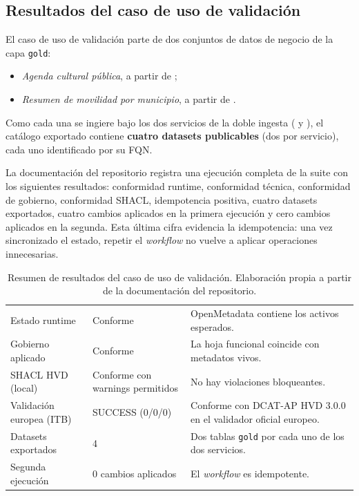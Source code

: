 
\subsection{Resultados del caso de uso de validación}

El caso de uso de validación parte de dos conjuntos de datos de negocio de la capa \texttt{gold}:

\begin{itemize}
  \item \emph{Agenda cultural pública}, a partir de ;
  \item \emph{Resumen de movilidad por municipio}, a partir de .
\end{itemize}

Como cada una se ingiere bajo los dos servicios de la doble ingesta ( y ), el catálogo exportado contiene \textbf{cuatro datasets publicables} (dos por servicio), cada uno identificado por su \ac{FQN}.

La documentación del repositorio registra una ejecución completa de la suite con los siguientes resultados: conformidad runtime, conformidad técnica, conformidad de gobierno, conformidad SHACL, idempotencia positiva, cuatro datasets exportados, cuatro cambios aplicados en la primera ejecución y cero cambios aplicados en la segunda. Esta última cifra evidencia la idempotencia: una vez sincronizado el estado, repetir el \emph{workflow} no vuelve a aplicar operaciones innecesarias.

\begin{table}[ht]
\footnotesize
\centering
\begin{tabular}{|L{5.5cm}|L{4cm}|L{4cm}|}
\hline
{}
 &  &  \\ \hline
Estado runtime & Conforme & OpenMetadata contiene los activos esperados. \\ \hline
Gobierno aplicado & Conforme & La hoja funcional coincide con metadatos vivos. \\ \hline
SHACL HVD (local) & Conforme con warnings permitidos & No hay violaciones bloqueantes. \\ \hline
Validación europea (ITB) & SUCCESS (0/0/0) & Conforme con DCAT-AP HVD 3.0.0 en el validador oficial europeo. \\ \hline
Datasets exportados & 4 & Dos tablas \texttt{gold} por cada uno de los dos servicios. \\ \hline
Segunda ejecución & 0 cambios aplicados & El \emph{workflow} es idempotente. \\ \hline
\end{tabular}
\caption{Resumen de resultados del caso de uso de validación. Elaboración propia a partir de la documentación del repositorio.}
\label{tab:resultados}
\end{table}

